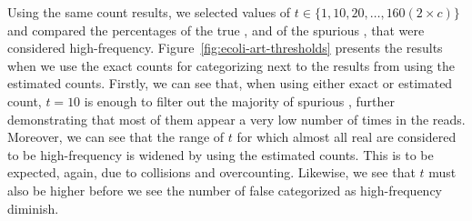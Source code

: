 Using the same count results, we selected values of $t \in \{1, 10, 20, \ldots, 160 (2 \times c)\}$ and compared the percentages of the true , and of the spurious , that were considered high-frequency. Figure~\ref{fig:ecoli-art-thresholds} presents the results when we use the exact counts for categorizing next to the results from using the estimated counts. Firstly, we can see that, when using either exact or estimated count, $t = 10$ is enough to filter out the majority of spurious , further demonstrating that most of them appear a very low number of times in the reads. Moreover, we can see that the range of $t$ for which almost all real  are considered to be high-frequency is widened by using the estimated counts. This is to be expected, again, due to collisions and overcounting. Likewise, we see that $t$ must also be higher before we see the number of false  categorized as high-frequency diminish.

